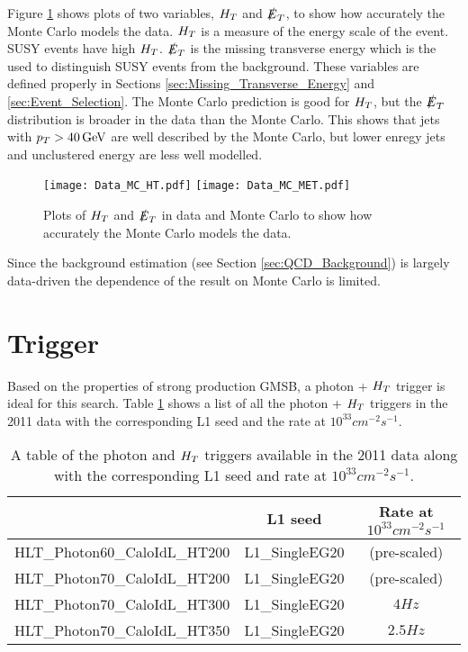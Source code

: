 Figure \ref{fig:Data_vs_MC} shows plots of two variables, $H_{T}$ and $\slashed{E}_{T}$,  to 
show how accurately the Monte Carlo models the data. $H_{T}$ is a measure of the 
energy scale of the event. SUSY events have high $H_{T}$. $\slashed{E}_{T}$ is the missing
transverse energy which is the used to distinguish SUSY events from the
background. These variables are defined properly in Sections
\ref{sec:Missing_Transverse_Energy} and \ref{sec:Event_Selection}. The Monte 
Carlo prediction is good for $H_{T}$, but the $\slashed{E}_{T}$ distribution is broader in 
the data than the Monte Carlo. This shows that jets with $p_{T} > 40 \, \mathrm{GeV}$
are well described by the Monte Carlo, but lower enregy jets and unclustered
energy are less well modelled. \\

\begin{figure}
\texttt{[image: Data\_MC\_HT.pdf]}
\texttt{[image: Data\_MC\_MET.pdf]}
\caption{Plots of $H_{T}$ and $\slashed{E}_{T}$ in data and Monte Carlo to show how accurately
the Monte Carlo models the data.}
\label{fig:Data_vs_MC}
\end{figure}

Since the background estimation (see Section \ref{sec:QCD_Background}) is 
largely data-driven the dependence of the result on Monte Carlo is limited.

\section{Trigger}

Based on the properties of strong production GMSB, a photon + $H_{T}$ trigger 
is ideal for this search. Table \ref{tab:Triggers} shows a list of all the 
photon + $H_{T}$ triggers in the 2011 data with the corresponding L1 seed and the
rate at $10^{33}\unit{cm^{-2}s^{-1}}$. \\

\begin{table}
\begin{center}
\begin{tabular}{|l|c|c|}
\hline
 & L1 seed & Rate at $10^{33}\unit{cm^{-2}s^{-1}}$ \\
\hline
HLT\_Photon60\_CaloIdL\_HT200 & L1\_SingleEG20 & (pre-scaled) \\
HLT\_Photon70\_CaloIdL\_HT200 & L1\_SingleEG20 & (pre-scaled) \\
HLT\_Photon70\_CaloIdL\_HT300 & L1\_SingleEG20 & $4\unit{Hz}$ \\
HLT\_Photon70\_CaloIdL\_HT350 & L1\_SingleEG20 & $2.5\unit{Hz}$ \\
\hline
\end{tabular}
\end{center}
\caption{A table of the photon and $H_{T}$ triggers available in the 2011 data
along with the corresponding L1 seed and rate at $10^{33}\unit{cm^{-2}s^{-1}}$.}
\label{tab:Triggers}
\end{table}

